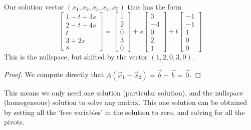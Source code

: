 Our solution vector $(x_1,x_2,x_3,x_4,x_5)$ thus has the form \[
\begin{bmatrix}
	1-t+3s\\ 2-t-4s\\ t\\ 3+2s\\ s
\end{bmatrix}= \begin{bmatrix}
	1\\2\\0\\3\\0
\end{bmatrix}+s\begin{bmatrix}
	3 \\ -4 \\ 0 \\ 2 \\ 1
\end{bmatrix} + t \begin{bmatrix}
	-1 \\ -1 \\ 1 \\0 \\0
\end{bmatrix}
\]
This is the nullspace, but shifted by the vector $(1,2,0,3,0)$.
\begin{proof}
	We compute directly that $A(\vec{x}_1-\vec{x}_2)=\vec{b}-\vec{b}=\vec{0}$.
\end{proof}
This means we only need one solution (particular solution), and the nullspace (homogeneous) solution to solve any matrix.
This one solution can be obtained by setting all the `free variables' in the solution to zero, and solving for all the pivots.


